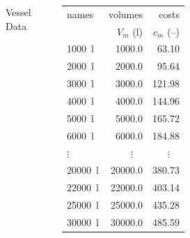 \documentclass{beamer}
\begin{document}
\begin{frame}
\begin{columns}
            \centering \small Vessel Data\\
            \begin{table}
                \scriptsize
                \begin{tabular}{l | r | r}
                    names & volumes & costs\\
                    & $V_{m}$ (l) & $c_{m}$ (--)\\\hline
                    \SI{1000}{\litre} & \SI{1000.0}{} & \SI{63.10}{}\\
                    \SI{2000}{\litre} & \SI{2000.0}{} & \SI{95.64}{}\\
                    \SI{3000}{\litre} & \SI{3000.0}{} & \SI{121.98}{}\\
                    \SI{4000}{\litre} & \SI{4000.0}{} & \SI{144.96}{}\\
                    \SI{5000}{\litre} & \SI{5000.0}{} & \SI{165.72}{}\\
                    \SI{6000}{\litre} & \SI{6000.0}{} & \SI{184.88}{}\\
                    \quad $\vdots$ & $\vdots\quad$ & $\vdots\quad$\\
                    \SI{20000}{\litre} & \SI{20000.0}{} & \SI{380.73}{}\\
                    \SI{22000}{\litre} & \SI{22000.0}{} & \SI{403.14}{}\\
                    \SI{25000}{\litre} & \SI{25000.0}{} & \SI{435.28}{}\\
                    \SI{30000}{\litre} & \SI{30000.0}{} & \SI{485.59}{}\\
                \end{tabular}
            \end{table}
    \end{columns}
\end{frame}
\end{document}
